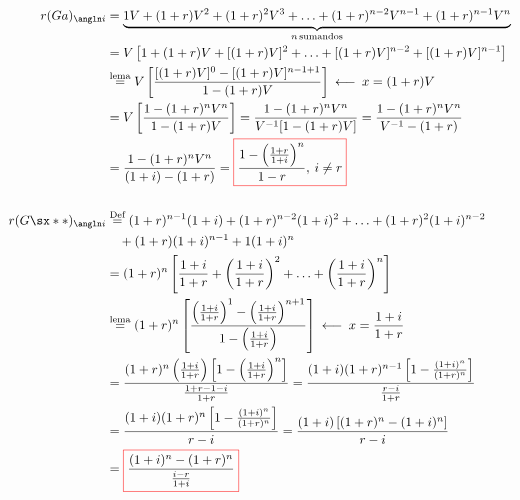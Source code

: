 \begin{align*}
r(Ga)_{\angln i} &= \underbrace{1V + (1+r)V^2 + (1+r)^2V^3 + \ldots + (1+r)^{n-2}V^{n-1} + (1+r)^{n-1}V^n}_{\scriptstyle n \, \text{sumandos}} \\
&= V\left[ 1+(1+r)V + [(1+r)V]^2 + \ldots + [(1+r)V]^{n-2} + [(1+r)V]^{n-1}\right]\\
& \mathrel{\stackon[1.5pt]{$=$}{$\scriptstyle \text{lema}$}} V\left[\frac{[(1+r)V]^0 - [(1+r)V]^{n-1+1}}{1-(1+r)V} \right] \: \longleftarrow \: x = (1+r)V\\
&= V\left[\frac{1-(1+r)^nV^n}{1-(1+r)V} \right] = \frac{1-(1+r)^nV^n}{V^{-1}[1-(1+r)V]} = \frac{1-(1+r)^nV^n}{V^{-1}-(1+r)} \\
& = \frac{1-(1+r)^n V^n}{(1+i)-(1+r)} = \color{red}\boxed{\color{black}\frac{1-\left(\frac{1+r}{1+i} \right)^n }{1-r}, \: i \neq r}\\
&\hfill\\
r(G\sx**{})_{\angln i} &\mathrel{\stackon[1.5pt]{$=$}{$\scriptstyle \text{Def}$}} (1+r)^{n-1}(1+i) + (1+r)^{n-2}(1+i)^2 + \ldots + (1+r)^2(1+i)^{n-2} \\
&\quad + (1+r)(1+i)^{n-1} + 1(1+i)^n \\
&= (1+r)^n \left[\frac{1+i}{1+r} + \left(\frac{1+i}{1+r} \right)^2 + \ldots + \left( \frac{1+i}{1+r} \right)^n  \right] \\
&\mathrel{\stackon[1.5pt]{$=$}{$\scriptstyle \text{lema}$}} (1+r)^n \left[\frac{\left(\frac{1+i}{1+r} \right)^1 - \left( \frac{1+i}{1+r} \right)^{n+1} }{1 - \left(\frac{1+i}{1+r} \right) } \right] \: \longleftarrow \: x = \frac{1+i}{1+r}\\
& = \frac{(1+r)^n\left( \frac{1+i}{1+r}\right)\left[1 - \left(\frac{1+i}{1+r} \right)^n  \right]  }{\frac{1+r-1-i}{1+r}} = \frac{(1+i)(1+r)^{n-1}\left[1 - \frac{(1+i)^n}{(1+r)^n}  \right] }{\frac{r-i}{1+r}}\\
&= \frac{(1+i)(1+r)^n\left[1 - \frac{(1+i)^n}{(1+r)^n} \right] }{r-i} = \frac{(1+i)\left[(1+r)^n - (1+i)^n \right] }{r-i}\\
& = \color{red}\boxed{\color{black}\frac{(1+i)^n - (1+r)^n}{\frac{i-r}{1+i}}}
\end{align*}
